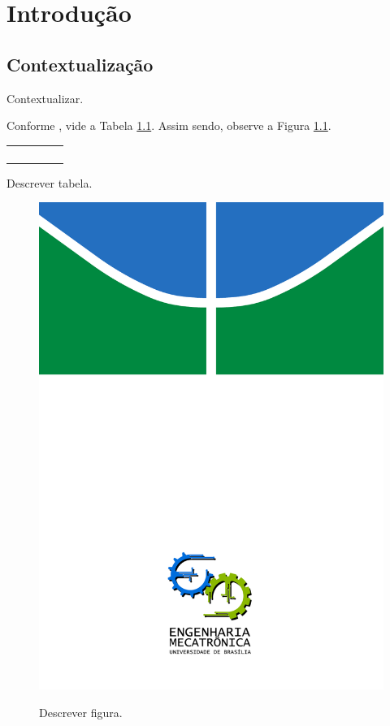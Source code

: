 \chapter{Introdução}

\label{CapIntro}



\section{Contextualização}

Contextualizar.

Conforme \cite{article:dummy}, vide a Tabela \ref{tab:Descrever-tabela}.
Assim sendo, observe a Figura \ref{fig:Descrever-figura.}.
\begin{table}[h]
\begin{centering}
\begin{tabular}{|c|c|c|c|c|}
\hline
 &  &  &  & \tabularnewline
\hline
\hline
 &  &  &  & \tabularnewline
\hline
 &  &  &  & \tabularnewline
\hline
 &  &  &  & \tabularnewline
\hline
 &  &  &  & \tabularnewline
\hline
\end{tabular}
\par\end{centering}

\label{tab:Descrever-tabela}Descrever tabela.


\end{table}


\begin{figure}[h]
\begin{centering}
\includegraphics[width=0.4\columnwidth]{figs/capa_fundo}
\par\end{centering}

\label{fig:Descrever-figura.}Descrever figura.


\end{figure}



